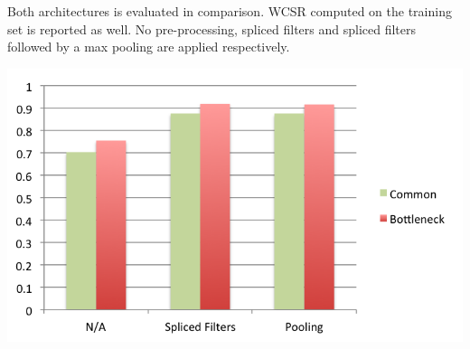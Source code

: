 \documentclass[landscape,archE1,fontscale=0.315]{baposter} %
\begin{document}
\begin{poster}
{\begin{multicols}{2}

Both architectures is evaluated in comparison. WCSR computed on the training
set is reported as well. No pre-processing, spliced filters and
spliced filters followed by a max pooling are applied respectively. 

\begin{center}
\includegraphics[width=0.8\linewidth]{architecture}
\end{center}



\end{multicols}
}



\end{poster}
\end{document}
